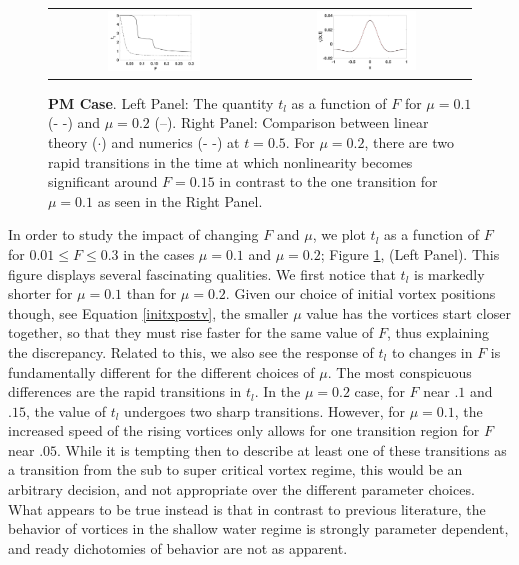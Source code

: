 \documentclass[a4paper,11pt]{article}
\begin{document}
%
\begin{figure}[!h]
\centering
\begin{tabular}{cc}
\includegraphics[width=0.46\textwidth]{froude_lin}& \includegraphics[width=0.5\textwidth]{lin_response_tf_pt5} \\
\end{tabular}
\caption{\small {\bf PM Case}. Left Panel: The quantity $t_{l}$ as a function of $F$  for $\mu=0.1$ (- -) and $\mu=0.2$ (--).  Right Panel: Comparison between linear theory ($\cdot$) and numerics (- -) at $t=0.5$.  For $\mu=0.2$, there are two rapid transitions in the time at which nonlinearity becomes significant around $F=0.15$ in contrast to the one transition for $\mu=0.1$ as seen in the Right Panel.}
\label{fig:linrep}
\end{figure}
In order to study the impact of changing $F$ and $\mu$, we plot $t_{l}$ as a function of $F$ for $0.01\leq F \leq 0.3$ in the cases $\mu=0.1$ and $\mu=0.2$; Figure \ref{fig:linrep}, (Left Panel).  This figure displays several fascinating qualities.  We first notice that $t_{l}$ is markedly shorter for $\mu=0.1$ than for $\mu=0.2$.  Given our choice of initial vortex positions though, see Equation \eqref{initxpostv}, the smaller $\mu$ value has the vortices start closer together, so that they must rise faster for the same value of $F$, thus explaining the discrepancy.  Related to this, we also see the response of $t_{l}$ to changes in $F$ is fundamentally different for the different choices of $\mu$.  The most conspicuous differences are the rapid transitions in $t_{l}$.  In the $\mu=0.2$ case, for $F$ near $.1$ and $.15$, the value of $t_{l}$ undergoes two sharp transitions.  However, for $\mu=0.1$, the increased speed of the rising vortices only allows for one transition region for $F$ near $.05$.  While it is tempting then to describe at least one of these transitions as a transition from the sub to super critical vortex regime, this would be an arbitrary decision, and not appropriate over the different parameter choices.  What appears to be true instead is that in contrast to previous literature, the behavior of vortices in the shallow water regime is strongly parameter dependent, and ready dichotomies of behavior are not as apparent.  
\end{document}
